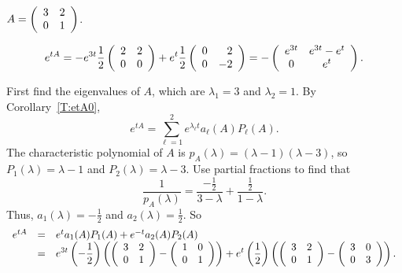 \documentclass{ximera}
\begin{document}
\begin{exercise} \label{c12.1.6c}
$A = \left(\begin{array}{rr} 3 & 2\\ 0 &1\end{array}\right)$.

\begin{solution}
\ans
\[
e^{tA} = -e^{3t}\frac{1}{2}\left(\begin{array}{rr} 2 & 2\\ 0 &0\end{array}\right) +
e^t\frac{1}{2}\left(\begin{array}{rr} 0 & 2\\ 0 &-2\end{array}\right)
= -\left(\begin{array}{cc} e^{3t} & e^{3t} - e^{t}\\ 0 &e^{t}\end{array}\right).
\]

\soln First find the eigenvalues of $A$, which are $\lambda_1 = 3$ and
$\lambda_2 = 1$.  By Corollary~\ref{T:etA0},
\[
e^{tA} = \sum_{\ell = 1}^2 e^{\lambda_\ell t}a_\ell(A)P_\ell(A).
\]
The characteristic polynomial of $A$ is $p_A(\lambda) = (\lambda -
1)(\lambda - 3)$, so $P_1(\lambda) = \lambda - 1$ and $P_2(\lambda) =
\lambda - 3$.  Use partial fractions to find that
\[
\frac{1}{p_A(\lambda)} = \frac{-\frac{1}{2}}{3 - \lambda} + \frac{\frac{1}{2}}
{1 - \lambda}.
\]
Thus, $a_1(\lambda) = -\frac{1}{2}$ and $a_2(\lambda) = \frac{1}{2}$.  So
\[
\begin{array}{rcl}
e^{tA} & = & e^ta_1(A)P_1(A) + e^{-t}a_2(A)P_2(A) \\
& = & \displaystyle e^{3t}\left(-\frac{1}{2}\right)\left(\left(\begin{array}{rr} 3 & 2\\ 0 &1\end{array}\right) -
\left(\begin{array}{rr} 1 & 0\\ 0 &1\end{array}\right)\right) + e^{t}\left(\frac{1}{2}\right)
\left(\left(\begin{array}{rr} 3 & 2\\ 0 &1\end{array}\right) - \left(\begin{array}{rr} 3 & 0\\ 0 &3\end{array}\right)\right).
\end{array}
\]


\end{solution}
\end{exercise}
\end{document}
